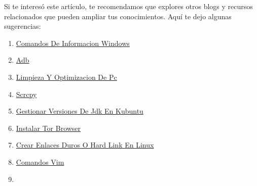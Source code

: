 \documentclass[
  jou,
  floatsintext,
  longtable,
  a4paper,
  nolmodern,
  notxfonts,
  notimes,
  12pt,
  colorlinks=true,linkcolor=blue,citecolor=blue,urlcolor=blue]{apa7}
\providecommand{\tightlist}{%
  \setlength{\itemsep}{0pt}\setlength{\parskip}{0pt}}
\begin{document}
Si te interesó este artículo, te recomendamos que explores otros blogs y
recursos relacionados que pueden ampliar tus conocimientos. Aquí te dejo
algunas sugerencias:

\begin{enumerate}
\def\labelenumi{\arabic{enumi}.}
\tightlist
\item
  \href{https://chaska-x.netlify.app/operating-system/2017-05-21-comandos-de-informacion-windows/index.pdf}{}
  \href{https://chaska-x.netlify.app/operating-system/2017-05-21-comandos-de-informacion-windows}{Comandos
  De Informacion Windows}
\item
  \href{https://chaska-x.netlify.app/operating-system/2019-06-19-adb/index.pdf}{}
  \href{https://chaska-x.netlify.app/operating-system/2019-06-19-adb}{Adb}
\item
  \href{https://chaska-x.netlify.app/operating-system/2021-08-17-limpieza-y-optimizacion-de-pc/index.pdf}{}
  \href{https://chaska-x.netlify.app/operating-system/2021-08-17-limpieza-y-optimizacion-de-pc}{Limpieza
  Y Optimizacion De Pc}
\item
  \href{https://chaska-x.netlify.app/operating-system/2021-10-21-scrcpy/index.pdf}{}
  \href{https://chaska-x.netlify.app/operating-system/2021-10-21-scrcpy}{Scrcpy}
\item
  \href{https://chaska-x.netlify.app/operating-system/2022-05-12-gestionar-versiones-de-jdk-en-kubuntu/index.pdf}{}
  \href{https://chaska-x.netlify.app/operating-system/2022-05-12-gestionar-versiones-de-jdk-en-kubuntu}{Gestionar
  Versiones De Jdk En Kubuntu}
\item
  \href{https://chaska-x.netlify.app/operating-system/2022-07-21-instalar-tor-browser/index.pdf}{}
  \href{https://chaska-x.netlify.app/operating-system/2022-07-21-instalar-tor-browser}{Instalar
  Tor Browser}
\item
  \href{https://chaska-x.netlify.app/operating-system/2022-08-14-crear-enlaces-duros-o-hard-link-en-linux/index.pdf}{}
  \href{https://chaska-x.netlify.app/operating-system/2022-08-14-crear-enlaces-duros-o-hard-link-en-linux}{Crear
  Enlaces Duros O Hard Link En Linux}
\item
  \href{https://chaska-x.netlify.app/operating-system/2022-09-27-comandos-vim/index.pdf}{}
  \href{https://chaska-x.netlify.app/operating-system/2022-09-27-comandos-vim}{Comandos
  Vim}
\item
  \href{https://chaska-x.netlify.app/operating-system/2023-02-16-guia-de-git-y-github/index.pdf}{}

\end{enumerate}
\end{document}
